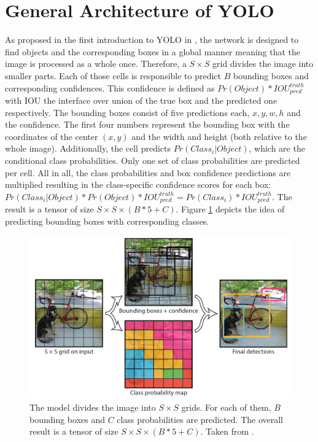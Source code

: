 \section{General Architecture of YOLO}
As proposed in the first introduction to YOLO in \cite{yolov1}, the network is designed to find objects and the corresponding boxes in a global manner meaning that the image is processed as a whole once. Therefore, a $ S \times S $ grid divides the image into smaller parts. Each of those cells is responsible to predict $ B $ bounding boxes and corresponding confidences. This confidence is defined as $ Pr(Object) * IOU_{pred}^{truth} $ with IOU the interface over union of the true box and the predicted one respectively. The bounding boxes consist of five predictions each, $ x, y, w, h $ and the confidence. The first four numbers represent the bounding box with the coordinates of the center $ (x,y) $ and the width and height (both relative to the whole image). Additionally, the cell predicts $ Pr(Class_i|Object) $, which are the conditional class probabilities. Only one set of class probabilities are predicted per cell. All in all, the class probabilities and box confidence predictions are multiplied resulting in the class-specific confidence scores for each box: $ Pr(Class_i|Object) * Pr(Object) * IOU_{pred}^{truth} = Pr(Class_i) * IOU_{pred}^{truth} $. The result is a tensor of size $ S \times S \times (B * 5 + C) $. Figure \ref{fig:YOLO_idea} depicts the idea of predicting bounding boxes with corresponding classes.
 
\begin{figure}[htb!]
	\centering
	\includegraphics[scale=0.3]{figures/YOLO_functionality.png}
	\caption{The model divides the image into $ S \times S $ grids. For each of them, $ B $ bounding boxes and $ C $ class probabilities are predicted. The overall result is a tensor of size $ S \times S \times (B*5 + C) $. Taken from \cite{yolov1}.}
	\label{fig:YOLO_idea}
\end{figure}

